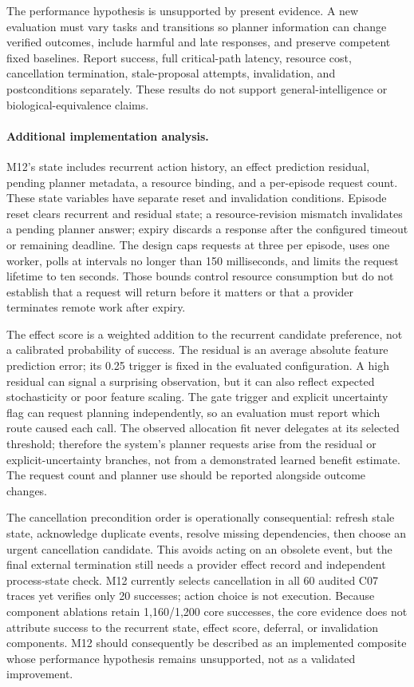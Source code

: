 The performance hypothesis is unsupported by present evidence. A new evaluation must vary tasks and transitions so planner information can change verified outcomes, include harmful and late responses, and preserve competent fixed baselines. Report success, full critical-path latency, resource cost, cancellation termination, stale-proposal attempts, invalidation, and postconditions separately. These results do not support general-intelligence or biological-equivalence claims.


\paragraph{Additional implementation analysis.} M12's state includes recurrent action history, an effect prediction residual, pending planner metadata, a resource binding, and a per-episode request count. These state variables have separate reset and invalidation conditions. Episode reset clears recurrent and residual state; a resource-revision mismatch invalidates a pending planner answer; expiry discards a response after the configured timeout or remaining deadline. The design caps requests at three per episode, uses one worker, polls at intervals no longer than 150 milliseconds, and limits the request lifetime to ten seconds. Those bounds control resource consumption but do not establish that a request will return before it matters or that a provider terminates remote work after expiry.

The effect score is a weighted addition to the recurrent candidate preference, not a calibrated probability of success. The residual is an average absolute feature prediction error; its 0.25 trigger is fixed in the evaluated configuration. A high residual can signal a surprising observation, but it can also reflect expected stochasticity or poor feature scaling. The gate trigger and explicit uncertainty flag can request planning independently, so an evaluation must report which route caused each call. The observed allocation fit never delegates at its selected threshold; therefore the system's planner requests arise from the residual or explicit-uncertainty branches, not from a demonstrated learned benefit estimate. The request count and planner use should be reported alongside outcome changes.

The cancellation precondition order is operationally consequential: refresh stale state, acknowledge duplicate events, resolve missing dependencies, then choose an urgent cancellation candidate. This avoids acting on an obsolete event, but the final external termination still needs a provider effect record and independent process-state check. M12 currently selects cancellation in all 60 audited C07 traces yet verifies only 20 successes; action choice is not execution. Because component ablations retain 1,160/1,200 core successes, the core evidence does not attribute success to the recurrent state, effect score, deferral, or invalidation components. M12 should consequently be described as an implemented composite whose performance hypothesis remains unsupported, not as a validated improvement.
